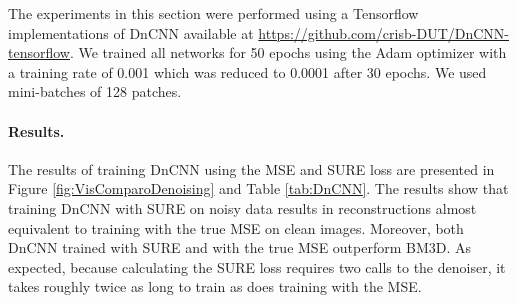 \documentclass{article}
\begin{document}
The experiments in this section were performed using a Tensorflow implementations of DnCNN available at \url{https://github.com/crisb-DUT/DnCNN-tensorflow}.
We trained all networks for 50 epochs using the Adam optimizer \cite{ADAMopt} with a training rate of 0.001 which was reduced to 0.0001 after 30 epochs. We used mini-batches of 128 patches. 

\paragraph{Results.}%
The results of training DnCNN using the MSE and SURE loss are presented in Figure \ref{fig:VisComparoDenoising} and Table \ref{tab:DnCNN}. 
The results show that training DnCNN with SURE on noisy data results in reconstructions almost equivalent to training with the true MSE on clean images. Moreover, both DnCNN trained with SURE and with the true MSE outperform BM3D. As expected, because calculating the SURE loss requires two calls to the denoiser, it takes roughly twice as long to train as does training with the MSE.
\end{document}
